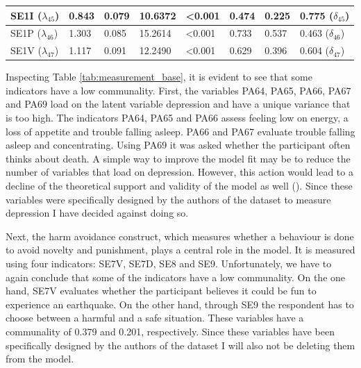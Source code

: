 \documentclass[11pt]{article}
\begin{document}
\begin{table}[h!]
{\begin{tabular}{|l|l|l|l|l|l|l|l|}
SE1I  \hfill ($\lambda_{45}$)     & 0.843            & 0.079                   & 10.6372            & \textless 0.001    & 0.474                   &  0.225               & 0.775 \hfill ($\delta_{45}$)  \\ \hline
SE1P  \hfill ($\lambda_{46}$)     & 1.303            & 0.085                   & 15.2614            & \textless 0.001    & 0.733                   &  0.537               & 0.463 \hfill ($\delta_{46}$)  \\ \hline
SE1V  \hfill ($\lambda_{47}$)     & 1.117            & 0.091                   & 12.2490            & \textless 0.001    & 0.629                   &  0.396               & 0.604 \hfill ($\delta_{47}$)  \\ \hline
\end{tabular}                                                                                                                                           
}
\end{table}
 
Inspecting Table \ref{tab:measurement_base}, it is evident to see that some
indicators have a low communality.
First, the variables PA64, PA65, PA66, PA67 and PA69 load on the latent variable
depression and have a unique variance that is too high. The indicators PA64, PA65
and PA66 assess feeling low on energy, a loss of appetite and trouble falling
asleep. PA66 and PA67 evaluate trouble falling asleep and concentrating. Using
PA69 it was asked whether the participant often thinks about death. A simple way
to improve the model fit may be to reduce the number of variables that load on
depression. However, this action would lead to a decline of the theoretical
support and validity of the model as well (\cite{hair2010}). Since these variables
were specifically designed by the authors of the dataset to measure depression I
have decided against doing so.

Next, the harm avoidance construct, which measures whether a behaviour is done to
avoid novelty and punishment, plays a central role in the model. It is measured
using four indicators: SE7V, SE7D, SE8 and SE9. Unfortunately, we have to again
conclude that some of the indicators have a low communality.
On the one hand, SE7V evaluates whether the participant believes it could be fun
to experience an earthquake. On the other hand, through SE9 the respondent has
to choose between a harmful and a safe situation. These variables have a
communality of 0.379 and 0.201, respectively. Since these variables have been
specifically designed by the authors of the dataset I will also not be deleting
them from the model.
\end{document}
